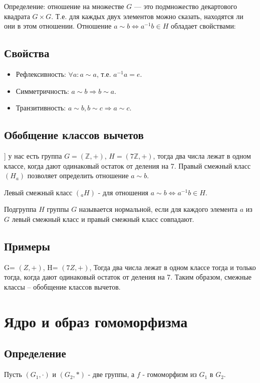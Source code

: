 \documentclass[12pt]{article}
\begin{document}
    Определение: отношение на множестве $G$ --- это подмножество декартового квадрата $G\times G$. Т.е. для каждых двух элементов можно сказать, находятся ли они в этом отношении. Отношение $a\sim b \Leftrightarrow a^{-1}b\in H$ обладает свойствами:

    \subsection{Свойства}
    \begin{itemize}
        \item Рефлексивность: $\forall a: a\sim a$, т.е. $a^{-1}a=e$.
        \item Симметричность: $a\sim b \Rightarrow b\sim a$.
        \item Транзитивность: $a\sim b, b\sim c \Rightarrow a\sim c$. \end{itemize}
    \subsection{Обобщение классов вычетов}
    ] у нас есть группа $G=(\mathbb{Z},+)$, $H=(7\mathbb{Z},+)$, тогда два числа лежат в одном классе, когда дают одинаковый остаток от деления на 7. Правый смежный класс $(H_a)$ позволяет определить отношение $a\sim b$.

    Левый смежный класс $({}_aH)$ - для отношения $a\sim b \Leftrightarrow a^{-1}b\in H$.

    Подгруппа $H$ группы $G$ называется нормальной, если для каждого элемента $a$ из $G$ левый смежный класс и правый смежный класс совпадают.

    \subsection{Примеры} G= $(Z,+)$, H= $(7Z,+)$, Тогда два числа лежат в одном классе тогда и только тогда, когда дают одинаковый остаток от деления на 7. Таким образом, смежные классы – обобщение классов вычетов.

    \section{Ядро и образ гомоморфизма}
    \subsection{Определение}
    Пусть $(G_1,\cdot)$ и $(G_2,*)$ - две группы, а $f$ - гомоморфизм из $G_1$ в $G_2$.
\end{document}
